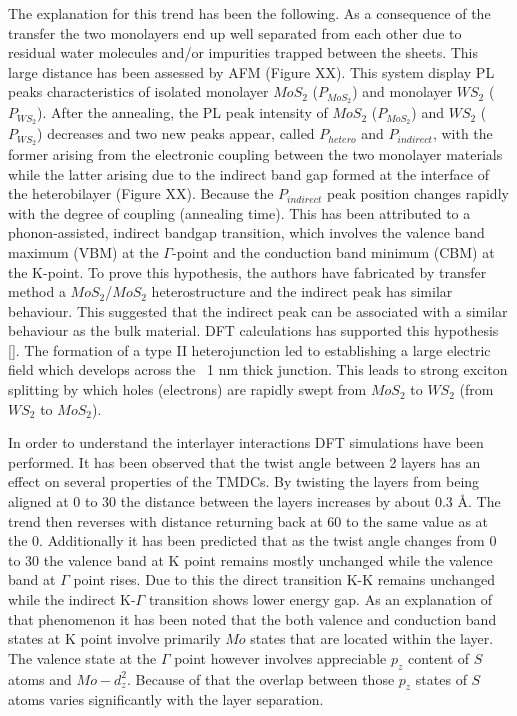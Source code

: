 The explanation for this trend has been the following.  As a consequence of the transfer the two monolayers end up well separated from each other due to residual water molecules and/or impurities trapped between the sheets. This large distance has been assessed by AFM (Figure XX). This system display PL peaks characteristics of isolated monolayer $MoS_2$ ($P_{MoS_2}$) and monolayer $WS_2$ ($P_{WS_2}$). After the annealing, the PL peak intensity of $MoS_2$ ($P_{MoS_2}$) and $WS_2$ ($P_{WS_2}$) decreases and two new peaks appear, called $P_{hetero}$ and $P_{indirect}$, with the former arising from the electronic coupling between the two monolayer materials while the latter arising due to the indirect band gap formed at the interface of the heterobilayer (Figure XX). Because the $P_{indirect}$ peak position changes rapidly with the degree of coupling (annealing time). This has been attributed to a phonon-assisted, indirect bandgap transition, which involves the valence band maximum (VBM) at the {$\Gamma$}-point and the conduction band minimum (CBM) at the K-point. To prove this hypothesis, the authors have fabricated by transfer method a $MoS_2$/$MoS_2$ heterostructure and the indirect peak has similar behaviour. This suggested that the indirect peak can be associated with a similar behaviour as the bulk material. DFT calculations has supported this hypothesis []. The formation of a type II heterojunction led to establishing a large electric field which develops across the ~1 nm thick junction. This leads to strong exciton splitting by which holes (electrons) are rapidly swept from $MoS_2$ to $WS_2$ (from $WS_2$  to $MoS_2$).

In order to understand the interlayer interactions DFT simulations have been performed. It has been observed that the twist angle between 2 layers has an effect on several properties of the TMDCs. By twisting the layers from being aligned at 0{\degree} to 30{\degree} the distance between the layers increases by about 0.3 \r{A}. The trend then reverses with distance returning back at 60 {\degree} to the same value as at the 0{\degree}. Additionally it has been predicted that as the twist angle changes from 0{\degree} to 30{\degree} the valence band at K point remains mostly unchanged while the valence band at $\Gamma$ point rises. Due to this the direct transition K-K remains unchanged while the indirect K-$\Gamma$ transition shows lower energy gap. As an explanation of that phenomenon it has been noted that the both valence and conduction band states at K point involve primarily $Mo$ states that are located within the layer. The valence state at the $\Gamma$ point however involves appreciable $p_z$ content of $S$ atoms and $Mo-d_z^2$. Because of that the overlap between those $p_z$ states of $S$ atoms varies significantly with the layer separation.

